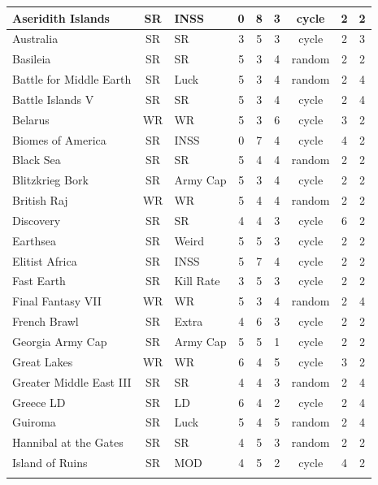 \begin{longtable}{|p{2.5cm}|c|p{1.5cm}|c|c|c|c|c|c|}
Aseridith Islands & SR & INSS & 0 & 8 & 3 & cycle & 2 & 2 \\ \hline
Australia & SR & SR & 3 & 5 & 3 & cycle & 2 & 3 \\ \hline
\rowcolor{Light_Blue}
Basileia & SR & SR & 5 & 3 & 4 & random & 2 & 2 \\ \hline
\rowcolor{Light_Blue}
Battle for Middle Earth & SR & Luck & 5 & 3 & 4 & random & 2 & 4 \\ \hline
Battle Islands V & SR & SR & 5 & 3 & 4 & cycle & 2 & 4 \\ \hline
Belarus & WR & WR & 5 & 3 & 6 & cycle & 3 & 2 \\ \hline
Biomes of America & SR & INSS & 0 & 7 & 4 & cycle & 4 & 2 \\ \hline
\rowcolor{Light_Blue}
Black Sea & SR & SR & 5 & 4 & 4 & random & 2 & 2 \\ \hline
Blitzkrieg Bork & SR & Army Cap & 5 & 3 & 4 & cycle & 2 & 2 \\ \hline
\rowcolor{Light_Blue}
British Raj & WR & WR & 5 & 4 & 4 & random & 2 & 2 \\ \hline
Discovery & SR & SR & 4 & 4 & 3 & cycle & 6 & 2 \\ \hline
Earthsea & SR & Weird & 5 & 5 & 3 & cycle & 2 & 2 \\ \hline
Elitist Africa & SR & INSS & 5 & 7 & 4 & cycle & 2 & 2 \\ \hline
Fast Earth & SR & Kill Rate & 3 & 5 & 3 & cycle & 2 & 2 \\ \hline
\rowcolor{Light_Blue}
Final Fantasy VII & WR & WR & 5 & 3 & 4 & random & 2 & 4 \\ \hline
French Brawl & SR & Extra & 4 & 6 & 3 & cycle & 2 & 2 \\ \hline
Georgia Army Cap & SR & Army Cap & 5 & 5 & 1 & cycle & 2 & 2 \\ \hline
Great Lakes & WR & WR & 6 & 4 & 5 & cycle & 3 & 2 \\ \hline
\rowcolor{Light_Blue}
Greater Middle East III & SR & SR & 4 & 4 & 3 & random & 2 & 4 \\ \hline
Greece LD & SR & LD & 6 & 4 & 2 & cycle & 2 & 4 \\ \hline
\rowcolor{Light_Blue}
Guiroma & SR & Luck & 5 & 4 & 5 & random & 2 & 4 \\ \hline
\rowcolor{Light_Blue}
Hannibal at the Gates & SR & SR & 4 & 5 & 3 & random & 2 & 2 \\ \hline
Island of Ruins & SR & MOD & 4 & 5 & 2 & cycle & 4 & 2 \\ \hline
\rowcolor{Light_Blue}

\end{longtable}
